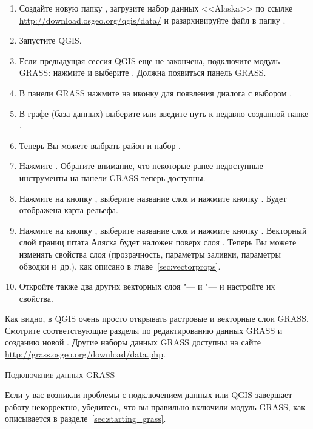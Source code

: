\begin{enumerate}
  \item Создайте новую папку , загрузите набор
  данных <<Alaska>>  по ссылке
  \url{http://download.osgeo.org/qgis/data/} и разархивируйте файл в
  папку .
  \item Запустите QGIS.
  \item Если предыдущая сессия QGIS еще не закончена, подключите
  модуль GRASS: нажмите  \arrow {} и выберите . Должна появиться панель
  GRASS.
  \item В панели GRASS нажмите на иконку
   для появления диалога
  с выбором .
  \item В графе  (база данных) выберите или введите
  путь к недавно созданной папке .
  \item Теперь Вы можете выбрать район  и набор
  .
  \item Нажмите . Обратите внимание, что некоторые ранее
  недоступные инструменты на панели GRASS теперь доступны.
  \item Нажмите на кнопку , выберите название слоя 
  и нажмите кнопку . Будет отображена карта рельефа.
  \item Нажмите на кнопку , выберите название слоя 
  и нажмите кнопку . Векторный слой границ штата Аляска
  будет наложен поверх слоя . Теперь Вы можете
  изменять свойства слоя (прозрачность, параметры заливки, параметры
  обводки и~др.), как описано в главе~\ref{sec:vectorprops}.
  \item Откройте также два других векторных слоя "--- 
  и  "--- и настройте их свойства.
\end{enumerate}

Как видно, в QGIS очень просто открывать растровые и векторные слои
GRASS. Смотрите соответствующие разделы по редактированию данных GRASS
и созданию новой . Другие наборы данных GRASS
доступны на сайте \url{http://grass.osgeo.org/download/data.php}.

\begin{Tip}\caption{\textsc{Подключение данных GRASS}}
Если у вас возникли проблемы с подключением данных или QGIS завершает
работу некорректно, убедитесь, что вы правильно включили модуль GRASS,
как описывается в разделе~\ref{sec:starting_grass}.
\end{Tip}

